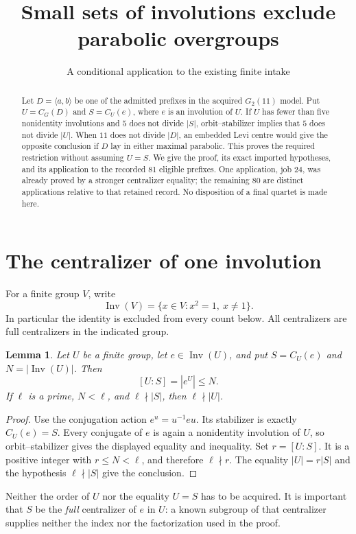 \documentclass[11pt]{article}
\title{Small sets of involutions exclude parabolic overgroups}
\author{A conditional application to the existing finite intake}
\date{}
\newtheorem{lemma}{Lemma}
\theoremstyle{remark}\newtheorem{remark}[lemma]{Remark}
\newcommand{\Inv}{\operatorname{Inv}}
\newcommand{\gen}[1]{\langle #1\rangle}
\begin{document}
\maketitle
\begin{abstract}
Let $D=\gen{a,b}$ be one of the admitted prefixes in the acquired
$G_2(11)$ model. Put $U=C_G(D)$ and $S=C_U(e)$, where $e$ is an
involution of $U$. If $U$ has fewer than five nonidentity involutions
and $5$ does not divide $|S|$, orbit--stabilizer implies that $5$ does
not divide $|U|$. When $11$ does not divide $|D|$, an embedded Levi
centre would give the opposite conclusion if $D$ lay in either maximal
parabolic. This proves the required restriction without assuming
$U=S$. We give the proof, its exact imported hypotheses, and its
application to the recorded 81 eligible prefixes. One application,
job 24, was already proved by a stronger centralizer equality; the
remaining 80 are distinct applications relative to that retained record.
No disposition of a final quartet is made here.
\end{abstract}

\section{The centralizer of one involution}

For a finite group $V$, write
\[
 \Inv(V)=\{x\in V:x^2=1,\ x\ne1\}.
\]
In particular the identity is excluded from every count below. All
centralizers are full centralizers in the indicated group.

\begin{lemma}\label{orbit}
Let $U$ be a finite group, let $e\in\Inv(U)$, and put $S=C_U(e)$ and
$N=|\Inv(U)|$. Then
\[
 [U:S]=|e^U|\leq N.
\]
If $\ell$ is a prime, $N<\ell$, and $\ell\nmid |S|$, then
$\ell\nmid |U|$.
\end{lemma}
\begin{proof}
Use the conjugation action $e^u=u^{-1}eu$. Its stabilizer is exactly
$C_U(e)=S$. Every conjugate of $e$ is again a nonidentity involution
of $U$, so orbit--stabilizer gives the displayed equality and inequality.
Set $r=[U:S]$. It is a positive integer with $r\leq N<\ell$, and
therefore $\ell\nmid r$. The equality $|U|=r|S|$ and the hypothesis
$\ell\nmid |S|$ give the conclusion.
\end{proof}

Neither the order of $U$ nor the equality $U=S$ has to be acquired.
It is important that $S$ be the \emph{full} centralizer of $e$ in $U$:
a known subgroup of that centralizer supplies neither the index nor
the factorization used in the proof.
\end{document}
